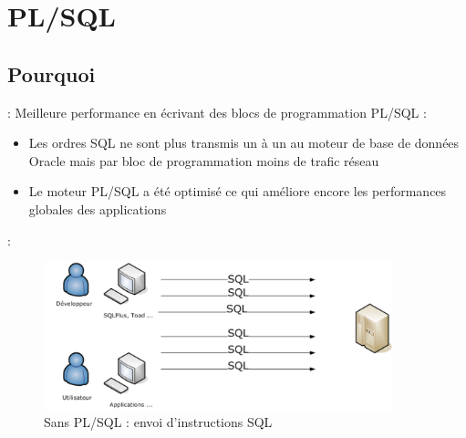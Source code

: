 \documentclass[10pt]{beamer}
\begin{document}
\section{PL/SQL}
\subsection{Pourquoi}

\begin{frame}{\secname : \subsecname}
    Meilleure performance en écrivant des blocs de programmation PL/SQL :
    \begin{itemize}
        \item Les ordres SQL ne sont plus transmis un à un au moteur de base de données Oracle mais par bloc de programmation        moins de trafic réseau
        \item Le moteur PL/SQL a été optimisé ce qui améliore encore les performances globales des applications
    \end{itemize}
\end{frame}

\begin{frame}{\secname : \subsecname}
    \begin{figure}
        \begin{center}
            \includegraphics[width=0.9\textwidth]{../assets/img/envoi_instruction.png}
            \caption{Sans PL/SQL : envoi d'instructions SQL}
        \end{center}
    \end{figure}
\end{frame}
\end{document}
